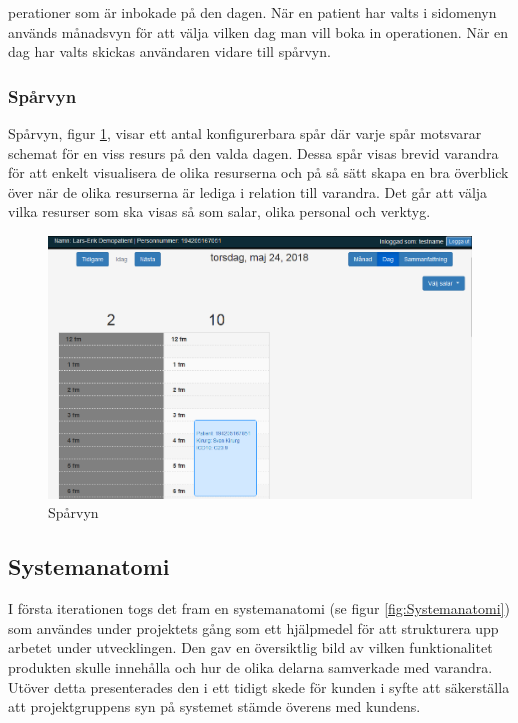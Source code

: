 perationer som är inbokade på den dagen. När en patient har valts i sidomenyn används månadsvyn för att välja vilken dag man vill boka in operationen. När en dag har valts skickas användaren vidare till spårvyn.

\subsubsection{Spårvyn}
Spårvyn, figur \ref{fig:track_view}, visar ett antal konfigurerbara spår där varje spår motsvarar schemat för en viss resurs på den valda dagen. Dessa spår visas brevid varandra för att enkelt visualisera de olika resurserna och på så sätt skapa en bra överblick över när de olika resurserna är lediga i relation till varandra. Det går att välja vilka resurser som ska visas så som salar, olika personal och verktyg.

\begin{figure}[H]
	\includegraphics[width=\linewidth]{Figures/track_view.png}
	\caption{Spårvyn}
	\label{fig:track_view}
\end{figure}


\subsection{Systemanatomi}
I första iterationen togs det fram en systemanatomi (se figur \ref{fig:Systemanatomi}) som användes under projektets gång som ett hjälpmedel för att strukturera upp arbetet under utvecklingen. Den gav en översiktlig bild av vilken funktionalitet produkten skulle innehålla och hur de olika delarna samverkade med varandra. Utöver detta presenterades den i ett tidigt skede för kunden i syfte att säkerställa att projektgruppens syn på systemet stämde överens med kundens.

